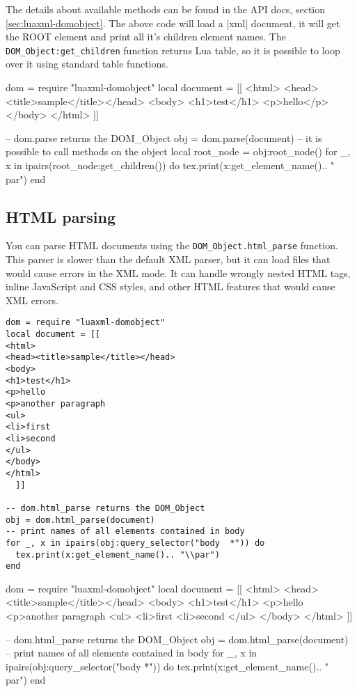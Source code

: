 \documentclass{ltxdoc}
\begin{document}
The details about available methods can be found in the API docs, section
\ref{sec:luaxml-domobject}. The above code will load a |xml| document, it will
get the ROOT element and print all it's children element names.  The
\verb|DOM_Object:get_children| function returns Lua table, so it is possible to
loop over it using standard table functions.

\begin{framed}
\begin{luacode*}
dom = require "luaxml-domobject"
local document = [[
<html>
<head><title>sample</title></head>
<body>
<h1>test</h1>
<p>hello</p>
</body>
</html>
  ]]

-- dom.parse returns the DOM_Object
obj = dom.parse(document)
-- it is possible to call methods on the object
local root_node = obj:root_node()
for _, x in ipairs(root_node:get_children()) do
  tex.print(x:get_element_name().. "\\par")
end
\end{luacode*}
\end{framed}

\subsection{HTML parsing}

You can parse HTML documents using the \verb|DOM_Object.html_parse| function. This parser is slower
than the default XML parser, but it can load files that would cause errors in the XML mode. 
It can handle wrongly nested HTML tags, inline JavaScript and CSS styles, and other HTML features
that would cause XML errors.

\begin{verbatim}
dom = require "luaxml-domobject"
local document = [[
<html>
<head><title>sample</title></head>
<body>
<h1>test</h1>
<p>hello
<p>another paragraph
<ul>
<li>first
<li>second
</ul>
</body>
</html>
  ]]

-- dom.html_parse returns the DOM_Object
obj = dom.html_parse(document)
-- print names of all elements contained in body
for _, x in ipairs(obj:query_selector("body  *")) do
  tex.print(x:get_element_name().. "\\par")
end
\end{verbatim}


\begin{framed}
\begin{luacode*}
dom = require "luaxml-domobject"
local document = [[
<html>
<head><title>sample</title></head>
<body>
<h1>test</h1>
<p>hello
<p>another paragraph
<ul>
<li>first
<li>second
</ul>
</body>
</html>
  ]]

-- dom.html_parse returns the DOM_Object
obj = dom.html_parse(document)
-- print names of all elements contained in body
for _, x in ipairs(obj:query_selector("body  *")) do
  tex.print(x:get_element_name().. "\\par")
end
\end{luacode*}
\end{framed}
\end{document}
